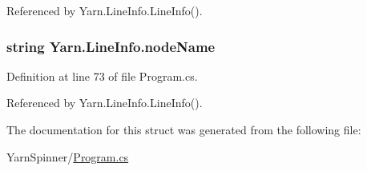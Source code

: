 Referenced by Yarn.\-Line\-Info.\-Line\-Info().

\hypertarget{a00125_a5a91331fb123e29d71d69e096f943c2f}{
\subsubsection[{node\-Name}]{\setlength{\rightskip}{0pt plus 5cm}string Yarn.\-Line\-Info.\-node\-Name}}\label{a00125_a5a91331fb123e29d71d69e096f943c2f}


Definition at line 73 of file Program.\-cs.



Referenced by Yarn.\-Line\-Info.\-Line\-Info().



The documentation for this struct was generated from the following file\-:\begin{DoxyCompactItemize}
\item 
Yarn\-Spinner/\hyperlink{a00302}{Program.\-cs}\end{DoxyCompactItemize}
